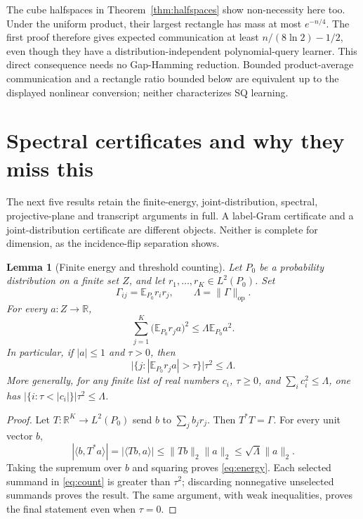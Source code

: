 \documentclass[11pt]{article}
\newtheorem{lemma}[theorem]{Lemma}
\newcommand{\R}{\mathbb R}
\newcommand{\E}{\mathbb E}
\newcommand{\1}{\mathbf 1}
\newcommand{\op}{\mathrm{op}}
\begin{document}
The cube halfspaces in Theorem~\ref{thm:halfspaces} show non-necessity here too. Under the uniform product, their largest rectangle has mass at most $e^{-n/4}$. The first proof therefore gives expected communication at least $n/(8\ln2)-1/2$, even though they have a distribution-independent polynomial-query learner. This direct consequence needs no Gap-Hamming reduction. Bounded product-average communication and a rectangle ratio bounded below are equivalent up to the displayed nonlinear conversion; neither characterizes SQ learning.


\section{Spectral certificates and why they miss this}\label{sec:retained}
The next five results retain the finite-energy, joint-distribution, spectral, projective-plane and transcript arguments in full. A label-Gram certificate and a joint-distribution certificate are different objects. Neither is complete for dimension, as the incidence-flip separation shows.

\begin{samepage}
\begin{lemma}[Finite energy and threshold counting]\label{thm:energy}
Let $P_0$ be a probability distribution on a finite set $Z$, and let $r_1,\ldots,r_K\in L^2(P_0)$. Set
\[
 \Gamma_{ij}=\E_{P_0}r_i r_j,\qquad \Lambda=\|\Gamma\|_\op.
\]
For every $a:Z\to\R$,
\begin{equation}\label{eq:energy}
 \sum_{j=1}^K\bigl(\E_{P_0}r_j a\bigr)^2
 \leq\Lambda\E_{P_0}a^2.
\end{equation}
In particular, if $|a|\leq1$ and $\tau>0$, then
\begin{equation}\label{eq:count}
 \bigl|\{j:|\E_{P_0}r_j a|>\tau\}\bigr|\tau^2\leq\Lambda.
\end{equation}
More generally, for any finite list of real numbers $c_i$, $\tau\geq0$, and $\sum_i c_i^2\leq\Lambda$, one has $|\{i:\tau<|c_i|\}|\tau^2\leq\Lambda$.
\end{lemma}
\end{samepage}
\begin{proof}
Let $T:\R^K\to L^2(P_0)$ send $b$ to $\sum_jb_jr_j$. Then $T^*T=\Gamma$. For every unit vector $b$,
\[
 |\langle b,T^*a\rangle|=|\langle Tb,a\rangle|
 \leq\|Tb\|_2\|a\|_2\leq\sqrt\Lambda\|a\|_2.
\]
Taking the supremum over $b$ and squaring proves \eqref{eq:energy}. Each selected summand in \eqref{eq:count} is greater than $\tau^2$; discarding nonnegative unselected summands proves the result. The same argument, with weak inequalities, proves the final statement even when $\tau=0$.
\end{proof}
\end{document}
